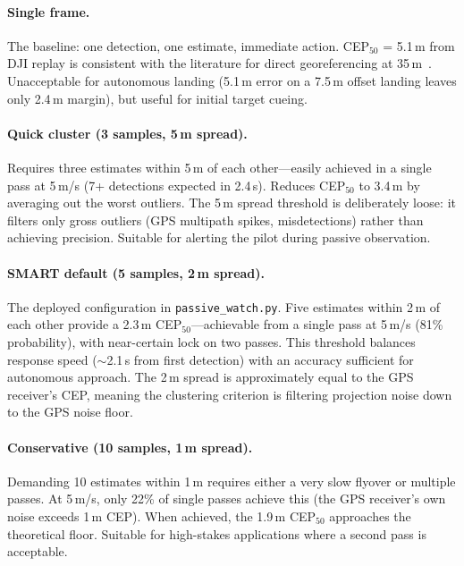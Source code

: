 \paragraph{Single frame.}  The baseline: one detection, one estimate, immediate action.  CEP$_{50}$ = 5.1\,m from DJI replay is consistent with the literature for direct georeferencing at 35\,m~\cite{sun2016sar, sambolek2025person}.  Unacceptable for autonomous landing (5.1\,m error on a 7.5\,m offset landing leaves only 2.4\,m margin), but useful for initial target cueing.

\paragraph{Quick cluster (3 samples, 5\,m spread).}  Requires three estimates within 5\,m of each other---easily achieved in a single pass at 5\,m/s (7+ detections expected in 2.4\,s).  Reduces CEP$_{50}$ to 3.4\,m by averaging out the worst outliers.  The 5\,m spread threshold is deliberately loose: it filters only gross outliers (GPS multipath spikes, misdetections) rather than achieving precision.  Suitable for alerting the pilot during passive observation.

\paragraph{SMART default (5 samples, 2\,m spread).}  The deployed configuration in \texttt{passive\_watch.py}.  Five estimates within 2\,m of each other provide a 2.3\,m CEP$_{50}$---achievable from a single pass at 5\,m/s (81\% probability), with near-certain lock on two passes.  This threshold balances response speed ($\sim$2.1\,s from first detection) with an accuracy sufficient for autonomous approach.  The 2\,m spread is approximately equal to the GPS receiver's CEP, meaning the clustering criterion is filtering projection noise down to the GPS noise floor.

\paragraph{Conservative (10 samples, 1\,m spread).}  Demanding 10 estimates within 1\,m requires either a very slow flyover or multiple passes.  At 5\,m/s, only 22\% of single passes achieve this (the GPS receiver's own noise exceeds 1\,m CEP).  When achieved, the 1.9\,m CEP$_{50}$ approaches the theoretical floor.  Suitable for high-stakes applications where a second pass is acceptable.

